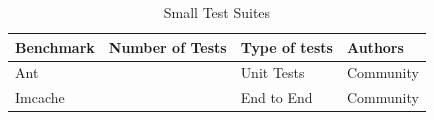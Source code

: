\begin{table}[]
\centering
\caption{Small Test Suites}
\label{small_test}
\begin{tabular}{|l|l|l|l|}
\hline
{\bf Benchmark}   & {\bf Number of Tests} & {\bf Type of tests} & {\bf Authors}  \\ \hline
Ant             &       &    Unit Tests      & Community \\ \hline
Imcache &           &    End to End        & Community \\ \hline
\end{tabular}
\end{table}

